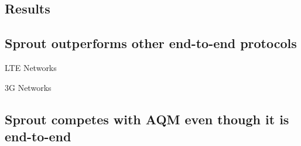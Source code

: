 \begin{multicols}{2}
\section*{Results}
\subsection*{Sprout outperforms other end-to-end protocols}
\begin{center}
LTE Networks
\end{center}

\begin{center}
\def\svgwidth{0.44\columnwidth}{\footnotesize  \bf }
\hspace{0.1\columnwidth}
\def\svgwidth{0.44\columnwidth}{\footnotesize  \bf }
\end{center}

\begin{center}
3G Networks
\end{center}

\begin{center}
\def\svgwidth{0.44\columnwidth}{\footnotesize  \bf }
\hspace{0.1\columnwidth}
\def\svgwidth{0.44\columnwidth}{\footnotesize \bf  }
\end{center}

\subsection*{Sprout competes with AQM even though it is end-to-end}
\begin{center}
\def\svgwidth{0.44\columnwidth}\footnotesize \bf 
\end{center}


\end{multicols}
